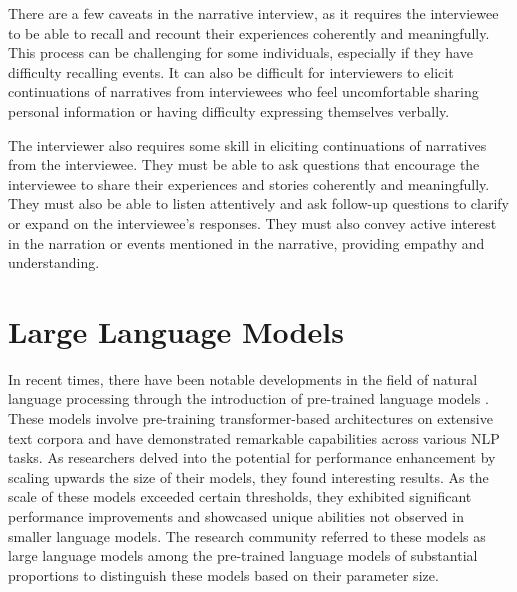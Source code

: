 There are a few caveats in the narrative interview, as it requires the interviewee to be able to recall and recount their experiences coherently and meaningfully. This process can be challenging for some individuals, especially if they have difficulty recalling events. It can also be difficult for interviewers to elicit continuations of narratives from interviewees who feel uncomfortable sharing personal information or having difficulty expressing themselves verbally. \cite{Sammantha2021-na}

The interviewer also requires some skill in eliciting continuations of narratives from the interviewee. They must be able to ask questions that encourage the interviewee to share their experiences and stories coherently and meaningfully. They must also be able to listen attentively and ask follow-up questions to clarify or expand on the interviewee's responses. They must also convey active interest in the narration or events mentioned in the narrative, providing empathy and understanding. \cite{Fairbairn2002-xd}
\section{Large Language Models}
In recent times, there have been notable developments in the field of natural language processing through the introduction of pre-trained language models \cite{radford2018improving}. These models involve pre-training transformer-based architectures \cite{vaswani2017attention} on extensive text corpora and have demonstrated remarkable capabilities across various NLP tasks. As researchers delved into the potential for performance enhancement by scaling upwards the size of their models, they found interesting results. As the scale of these models exceeded certain thresholds, they exhibited significant performance improvements and showcased unique abilities not observed in smaller language models. The research community referred to these models as large language models among the pre-trained language models of substantial proportions to distinguish these models based on their parameter size. \cite{zhao2023survey,wei2022emergent}

